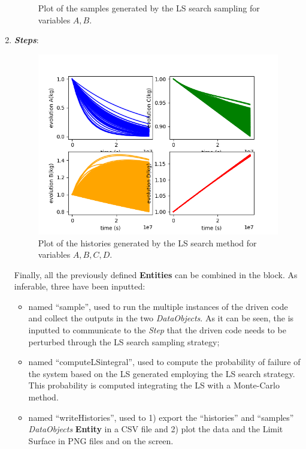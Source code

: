 \begin{enumerate}
\begin{figure}[h!]
  \caption{Plot of the samples generated by the LS search sampling for variables $A,B$.}
  \label{fig:LS_pointsets}
 \end{figure}
   \item \textbf{\textit{Steps}}:
 \begin{figure}[h!]
  \centering
  \includegraphics[scale=0.7]{../../tests/framework/user_guide/AdaptiveSamplingStrategies/gold/LSsearch/1-historyPlot_line-line-line-line.png}
  \caption{Plot of the histories generated by the LS search method for variables $A,B,C,D$.}
  \label{fig:LS_histories}
 \end{figure}
   Finally, all the previously defined \textbf{Entities} can be combined in
   the  block. As inferable,
   three  have been inputted:
   \begin{itemize}
     \item {} named ``sample'', used to run the multiple
     instances of the driven code and
     collect the outputs in the two \textit{DataObjects}. As it can be
     seen, the  is inputted to communicate to the
     \textit{Step} that the driven code needs to
     be perturbed through the LS search sampling strategy;
     \item {} named ``computeLSintegral'', used to
     compute the probability of failure of the system based on the LS generated employing the LS search strategy. This
     probability is computed integrating the LS with a Monte-Carlo
     method.
     \item  {} named ``writeHistories'', used to 1) export
     the ``histories'' and ``samples''  \textit{DataObjects}
     \textbf{Entity} in a CSV file and 2) plot the data and the Limit Surface
     in  PNG files and on the screen.
   \end{itemize}
\end{enumerate}
